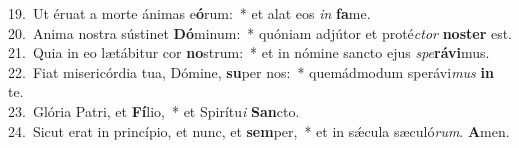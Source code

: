 {19.~}Ut éruat a morte ánimas e\textbf{ó}rum:~* et alat eos \textit{in} \textbf{fa}me.\\
{20.~}Anima nostra sústinet \textbf{Dó}minum:~* quóniam adjútor et proté\textit{ctor} \textbf{no}\textbf{ster} est.\\
{21.~}Quia in eo lætábitur cor \textbf{no}strum:~* et in nómine sancto ejus \textit{spe}\textbf{rá}\textbf{vi}mus.\\
{22.~}Fiat misericórdia tua, Dómine, \textbf{su}per nos:~* quemádmodum sperávi\textit{mus} \textbf{in} te.\\
{23.~}Glória Patri, et \textbf{Fí}lio,~* et Spirítu\textit{i} \textbf{San}cto.\\
{24.~}Sicut erat in princípio, et nunc, et \textbf{sem}per,~* et in sǽcula sæculó\textit{rum}. \textbf{A}men.\\
